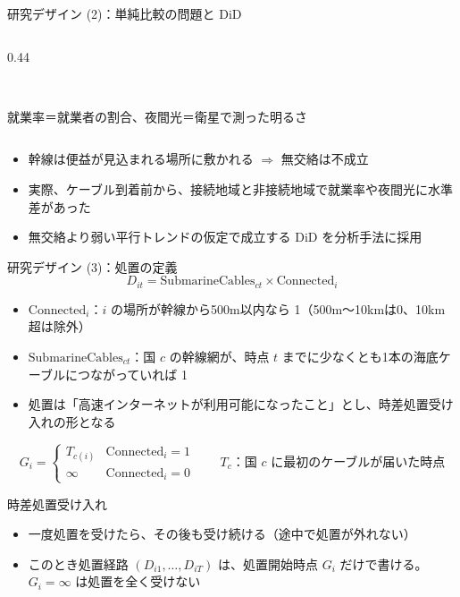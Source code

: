 \documentclass[aspectratio=169,11pt]{beamer}
\begin{document}
\begin{frame}{研究デザイン (2)：単純比較の問題と DiD}
\begin{columns}[c]
\begin{column}{0.44\textwidth}
\begin{tabular}{lrr}
        \bottomrule
      \end{tabular}\\[0.3em]
      {\tiny 就業率＝就業者の割合、夜間光＝衛星で測った明るさ}
    \end{column}
  \end{columns}
  \vspace{0.6em}
  \begin{itemize}\small
    \item 幹線は\alert{便益が見込まれる場所}に敷かれる $\Rightarrow$ 無交絡は不成立
    \item 実際、ケーブル到着前から、接続地域と非接続地域で就業率や夜間光に\alert{水準差}があった
    \item 無交絡より弱い\alert{平行トレンド}の仮定で成立する DiD を分析手法に採用
  \end{itemize}
\end{frame}
\begin{frame}{研究デザイン (3)：処置の定義}
  \small
  \[
    D_{it} = \text{SubmarineCables}_{ct} \times \text{Connected}_i
  \]
  \vspace{-0.6em}
  \begin{itemize}
    \item $\text{Connected}_i$：$i$ の場所が幹線から\alert{500m以内}なら 1（500m〜10kmは0、10km超は除外）
    \item $\text{SubmarineCables}_{ct}$：国 $c$ の幹線網が、時点 $t$ までに\alert{少なくとも1本}の海底ケーブルにつながっていれば 1
    \item 処置は「高速インターネットが利用可能になったこと」とし、時差処置受け入れの形となる
  \end{itemize}
  \[
    G_i =
    \begin{cases}
      T_{c(i)} & \text{Connected}_i = 1\\
      \infty & \text{Connected}_i = 0
    \end{cases}
    \qquad T_c\text{：国 } c \text{ に最初のケーブルが届いた時点}
  \]
  \vspace{0.2em}
  \begin{block}{時差処置受け入れ}
    \begin{itemize}
      \item 一度処置を受けたら、その後も受け続ける（途中で処置が外れない）
      \item このとき処置経路 $(D_{i1},\dots,D_{iT})$ は、\alert{処置開始時点 $G_i$} だけで書ける。$G_i=\infty$ は処置を全く受けない
    \end{itemize}
  \end{block}
\end{frame}
\end{document}
